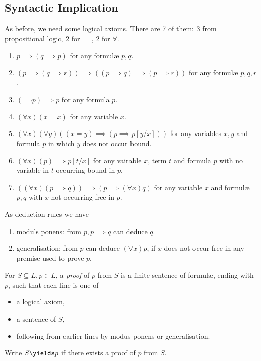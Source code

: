 \documentclass[a4paper]{article}
\begin{document}
\subsection{Syntactic Implication}

As before, we need some logical axioms. There are 7 of them: 3 from propositional logic, 2 for \(=\), 2 for \(\forall\).

\begin{enumerate}
\item \(p \implies (q \implies p)\) for any formulæ \(p, q\).
\item \((p \implies (q \implies r)) \implies ((p \implies q) \implies (p \implies r))\) for any formulæ \(p, q, r\).
\item \((\neg\neg p) \implies p\) for any formula \(p\).
\item \((\forall x) (x = x)\) for any variable \(x\).
\item \((\forall x) (\forall y) ((x = y) \implies (p \implies p[y/x]))\) for any variables \(x, y\) and formula \(p\) in which \(y\) does not occur bound.
\item \((\forall x) (p) \implies p[t/x]\) for any vairable \(x\), term \(t\) and formula \(p\) with no variable in \(t\) occurring bound in \(p\).
\item \(((\forall x) (p \implies q)) \implies (p \implies (\forall x) q)\) for any variable \(x\) and formulæ \(p, q\) with \(x\) not occurring free in \(p\).
\end{enumerate}

As deduction rules we have
\begin{enumerate}
\item moduls ponens: from \(p, p \implies q\) can deduce \(q\).
\item generalisation: from \(p\) can deduce \((\forall x) p\), if \(x\) does not occur free in any premise used to prove \(p\).
\end{enumerate}

\begin{definition}[Proof]
  For \(S \subseteq L, p \in L\), a \emph{proof} of \(p\) from \(S\) is a finite sentence of formulæ, ending with \(p\), such that each line is one of
  \begin{itemize}
  \item a logical axiom,
  \item a sentence of \(S\),
  \item following from earlier lines by modus ponens or generalisation.
  \end{itemize}
  Write \(S \yields p\) if there exists a proof of \(p\) from \(S\).
\end{definition}
\end{document}
